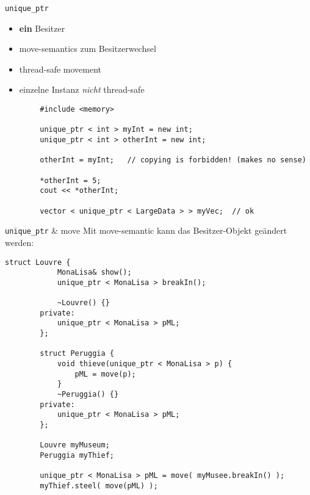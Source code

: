 \begin{frame}[fragile]{ \texttt{unique\_ptr} }
	\begin{itemize}
		\item \textbf{ein} Besitzer
		\item move-semantics zum Besitzerwechsel
		\item thread-safe movement
		\item einzelne Instanz \emph{nicht} thread-safe
	\end{itemize}
	
	\begin{lstlisting}
		#include <memory>
		
		unique_ptr < int > myInt = new int;
		unique_ptr < int > otherInt = new int;
		
		otherInt = myInt;	// copying is forbidden! (makes no sense)
		
		*otherInt = 5;
		cout << *otherInt;
		
		vector < unique_ptr < LargeData > > myVec;	// ok
	\end{lstlisting}
\end{frame}

\begin{frame}[fragile]{ \texttt{unique\_ptr} \& move }
	Mit move-semantic kann das Besitzer-Objekt geändert werden:
	
	\begin{lstlisting}[basicstyle=\tiny]
		struct Louvre {
		    MonaLisa& show();
		    unique_ptr < MonaLisa > breakIn();
			
		    ~Louvre() {}
		private:
		    unique_ptr < MonaLisa > pML;
		};
		
		struct Peruggia {
		    void thieve(unique_ptr < MonaLisa > p) {
		        pML = move(p);
		    }
		    ~Peruggia() {}
		private:
		    unique_ptr < MonaLisa > pML;
		};
		
		Louvre myMuseum;
		Peruggia myThief;
		
		unique_ptr < MonaLisa > pML = move( myMusee.breakIn() );
		myThief.steel( move(pML) );
	\end{lstlisting}
\end{frame}

